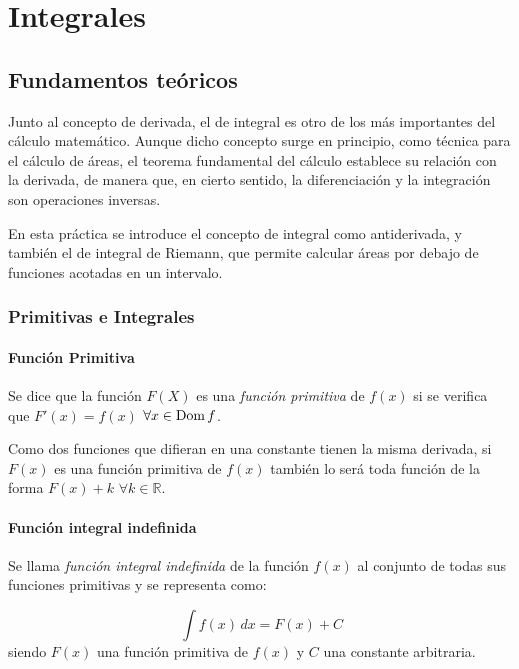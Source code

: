 
\chapter{Integrales}

\section{Fundamentos teóricos}
Junto al concepto de derivada, el de integral es otro de los más importantes
del cálculo matemático. Aunque dicho concepto surge en principio, como técnica
para el cálculo de áreas, el teorema fundamental del cálculo establece su
relación con la derivada, de manera que, en cierto sentido, la diferenciación
y la integración son operaciones inversas.

En esta práctica se introduce el concepto de integral como antiderivada, y
también el de integral de Riemann, que permite calcular áreas por debajo de
funciones acotadas en un intervalo.

\subsection{Primitivas e Integrales}
\subsubsection*{Función Primitiva}

Se dice que la función $F(X)$ es una \emph{función primitiva} de
$f(x)$ si se verifica que $F'(x)=f(x)$ $\forall x \in \mathop{\rm Dom}\nolimits f$.

Como dos funciones que difieran en una constante tienen la misma
derivada, si $F(x)$ es una función primitiva de $f(x)$ también lo será toda función de la forma $F(x)+k$ $\forall k \in \mathbb{R}$.\\


\subsubsection*{Función integral indefinida}

Se llama \emph{función integral indefinida} de la función $f(x)$ al
conjunto de todas sus funciones primitivas y se representa como:

\[
\ \int{f(x)}\,dx=F(x)+C
\]
siendo $F(x)$ una función primitiva de $f(x)$ y $C$ una constante arbitraria.\\


